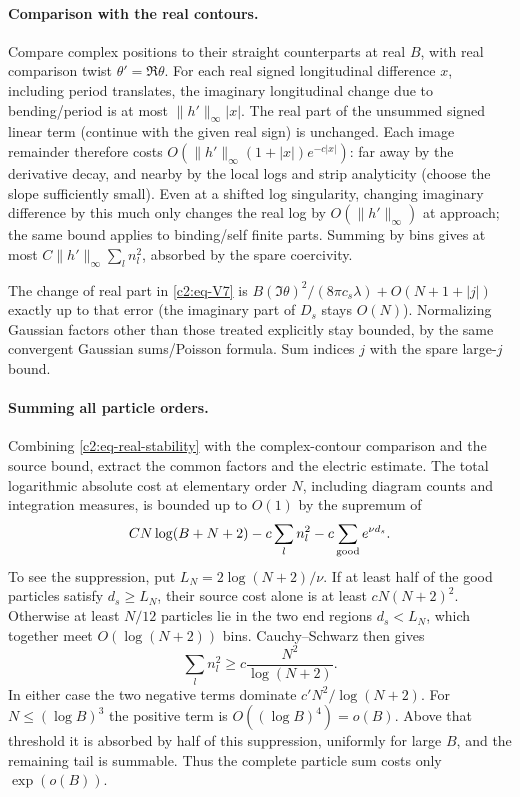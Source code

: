 \paragraph{Comparison with the real contours.}
Compare complex positions to their straight counterparts at real \(B\),
with real comparison twist \(\theta'=\Re\theta\). For each real signed longitudinal difference \(x\), including period translates, the imaginary longitudinal change due to bending/period is at most \(\|h'\|_\infty |x|\). The real part of the unsummed signed linear term (continue with the given real sign) is unchanged. Each image remainder therefore costs \(O(\|h'\|_\infty(1+|x|)e^{-c|x|})\): far away by the derivative decay, and nearby by the local logs and strip analyticity (choose the slope sufficiently small). Even at a shifted log singularity, changing imaginary difference by this much only changes the real log by \(O(\|h'\|_\infty)\) at approach; the same bound applies to binding/self finite parts. Summing by bins gives at most \(C\|h'\|_\infty\sum_l n_l^2\), absorbed by the spare coercivity. 

The change of real part in \eqref{c2:eq-V7} is \(B(\Im\theta)^2/(8\pi c_s\lambda)+O(N+1+|j|)\) exactly up to that error (the imaginary part of \(D_s\) stays \(O(N)\)). Normalizing Gaussian factors other than those treated explicitly stay bounded, by the same convergent Gaussian sums/Poisson formula. Sum indices \(j\) with the spare large-\(j\) bound.

\paragraph{Summing all particle orders.}
Combining \eqref{c2:eq-real-stability} with the complex-contour
comparison and the source bound, extract the common factors and the
electric estimate. The total logarithmic absolute cost at elementary order \(N\), including diagram
counts and integration measures, is bounded up to \(O(1)\) by the
supremum of
\[
 C N\log(B+N+2)-c\sum_l n_l^2-c\sum_{\rm good} e^{\nu d_s}.
\]
To see the suppression, put \(L_N=2\log(N+2)/\nu\). If at least
half of the good particles satisfy \(d_s\ge L_N\), their source cost
alone is at least \(cN(N+2)^2\). Otherwise at least \(N/12\)
particles lie in the two end regions \(d_s<L_N\), which together meet
\(O(\log(N+2))\) bins. Cauchy--Schwarz then gives
\[
 \sum_l n_l^2\ge c\frac{N^2}{\log(N+2)}.
\]
In either case the two negative terms dominate
\(c'N^2/\log(N+2)\). For \(N\le(\log B)^3\) the positive term is
\(O((\log B)^4)=o(B)\). Above that threshold it is absorbed by half
of this suppression, uniformly for large \(B\), and the remaining tail
is summable. Thus the complete particle sum costs only \(\exp(o(B))\).

